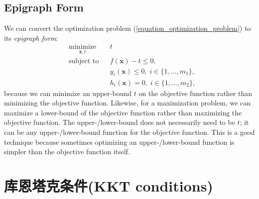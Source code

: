 \documentclass[lang=cn,10pt]{gorgeousnbook}
\numberwithin{equation}{section}%
\numberwithin{figure}{section}%
\begin{document}
\subsection{Epigraph Form}
We can convert the optimization problem (\ref{equation_optimization_problem}) to its \textit{epigraph form}:
\begin{equation}
\begin{aligned}
& \underset{\boldsymbol{x}, t}{\text{minimize}}
& & t \\
& \text{subject to}
& & f(\boldsymbol{x}) - t \leq 0, \\
& & & y_i(\boldsymbol{x}) \leq 0, \; i \in \{1, \ldots, m_1\}, \\
& & & h_i(\boldsymbol{x}) = 0, \; i \in \{1, \ldots, m_2\},
\end{aligned}
\end{equation}
because we can minimize an upper-bound $t$ on the objective function rather than minimizing the objective function.
Likewise, for a maximization problem, we can maximize a lower-bound of the objective function rather than maximizing the objective function.
The upper-/lower-bound does not necessarily need to be $t$; it can be any upper-/lower-bound function for the objective function.
This is a good technique because sometimes optimizing an upper-/lower-bound function is simpler than the objective function itself.

 
\section{库恩塔克条件(KKT conditions)}
\end{document}
